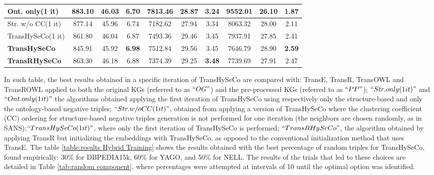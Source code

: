 \documentclass[sigconf]{acmart}
\newcommand{\TransHI}{TransHySeCo\xspace}
\begin{document}
\begin{scriptsize}
\begin{table}[t]
\begin{tabular}{|l|c|c|c|c|c|c|c|c|c|}
\hline
Ont. only(1 it) & 883.10 & 46.03 & 6.70 & 7813.46 & 28.87 & 3.24 & 9552.01 & 26.10 & 1.87 \\
\hline
Str. w/o CC(1 it) & 877.14 & 45.96 & 6.74 & 7182.62 & 27.94 & 3.34 & 8063.32 & 28.00 & 2.11 \\
\hline
\TransHI (1 it) & 861.80 & 46.04 & 6.87 & 7493.36 & 29.46 & 3.45 & 7937.91 & 27.85 & 2.41 \\
\hline
\textbf{\TransHI} & \cellcolor{lightgray}845.91 & \cellcolor{lightgray}45.92 & \cellcolor{lightgray}\textbf{6.98} & 7512.84 & 29.56 & 3.45 & \cellcolor{lightgray}7646.79 & \cellcolor{lightgray}28.90 & \cellcolor{lightgray}\textbf{2.59} \\
\hline
\textbf{TransRHySeCo} & 863.30 & 46.18 & 6.88 & \cellcolor{lightgray}7374.39 & \cellcolor{lightgray}29.25 & \cellcolor{lightgray}\textbf{3.48} & 7739.69 & 27.91 & 2.47 \\
\hline

\end{tabular}
\end{table}
\end{scriptsize}
In such table, the best results obtained in a specific iteration of \TransHI are compared with: TransE, TransR, TransOWL and TransROWL applied to both the original KGs (referred to as $``OG"$) and the pre-processed KGs (referred to as $``PP"$); $``Str. only (1 it)"$ and $``Ont. only (1 it)"$ the algorithms obtained applying the first iteration of \TransHI using respectively only the structure-based and only the ontology-based negative triples; $``Str. w/o CC (1 it)"$, obtained from applying a version of \TransHI where the clustering coefficient (CC) ordering for structure-based negative triples generation is not performed for one iteration (the neighbors are chosen randomly, as in SANS\cite{sanspaper});$``\TransHI (1 it)"$, where only the first iteration of \TransHI is performed;
$``TransRHySeCo"$, the algorithm obtained by applying TransR but initializing the embeddings with \TransHI, as opposed to the conventional initialization method that uses TransE. The table \ref{table:results Hybrid Training} shows the results obtained with the best percentage of random triples for \TransHI, found empirically: 30\% for DBPEDIA15k, 60\% for YAGO, and 50\% for NELL. The results of the trials that led to these choices are detailed in Table \ref{tab:random component}, where percentages were attempted at intervals of 10 until the optimal option was identified.
\end{document}
